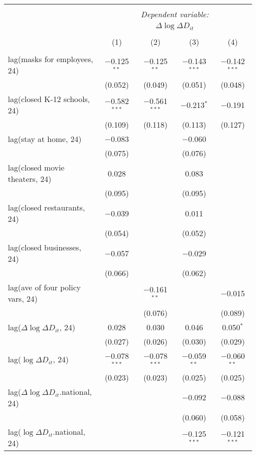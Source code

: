 \begin{tabular}{@{\extracolsep{1pt}}lcccc} 
\\[-1.8ex]\hline 
\hline \\[-1.8ex] 
 & \multicolumn{4}{c}{\textit{Dependent variable:}} \\ 
\cline{2-5} 
 & \multicolumn{4}{c}{$\Delta \log \Delta D_{it}$} \\ 
\\[-1.8ex] & (1) & (2) & (3) & (4)\\ 
\hline \\[-1.8ex] 
 lag(masks for employees, 24) & $-$0.125$^{**}$ & $-$0.125$^{**}$ & $-$0.143$^{***}$ & $-$0.142$^{***}$ \\ 
  & (0.052) & (0.049) & (0.051) & (0.048) \\ 
  lag(closed K-12 schools, 24) & $-$0.582$^{***}$ & $-$0.561$^{***}$ & $-$0.213$^{*}$ & $-$0.191 \\ 
  & (0.109) & (0.118) & (0.113) & (0.127) \\ 
  lag(stay at home, 24) & $-$0.083 &  & $-$0.060 &  \\ 
  & (0.075) &  & (0.076) &  \\ 
  lag(closed movie theaters, 24) & 0.028 &  & 0.083 &  \\ 
  & (0.095) &  & (0.095) &  \\ 
  lag(closed restaurants, 24) & $-$0.039 &  & 0.011 &  \\ 
  & (0.054) &  & (0.052) &  \\ 
  lag(closed businesses, 24) & $-$0.057 &  & $-$0.029 &  \\ 
  & (0.066) &  & (0.062) &  \\ 
  lag(ave of four policy vars, 24) &  & $-$0.161$^{**}$ &  & $-$0.015 \\ 
  &  & (0.076) &  & (0.089) \\ 
  lag($\Delta \log \Delta D_{it}$, 24) & 0.028 & 0.030 & 0.046 & 0.050$^{*}$ \\ 
  & (0.027) & (0.026) & (0.030) & (0.029) \\ 
  lag($\log \Delta D_{it}$, 24) & $-$0.078$^{***}$ & $-$0.078$^{***}$ & $-$0.059$^{**}$ & $-$0.060$^{**}$ \\ 
  & (0.023) & (0.023) & (0.025) & (0.025) \\ 
  lag($\Delta \log \Delta D_{it}$.national, 24) &  &  & $-$0.092 & $-$0.088 \\ 
  &  &  & (0.060) & (0.058) \\ 
  lag($\log \Delta D_{it}$.national, 24) &  &  & $-$0.125$^{***}$ & $-$0.121$^{***}$ \\ 

\end{tabular}

